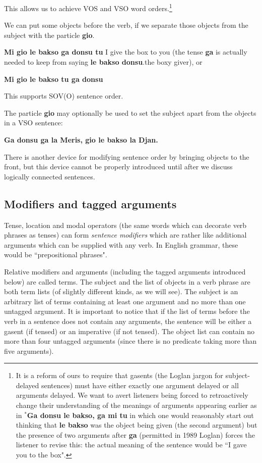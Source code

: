 \documentclass[12pt]{book}
\begin{document}
{This allows us to achieve VOS and VSO word orders.\footnote{It is a reform of ours to require that gasents (the Loglan jargon for subject-delayed sentences) must
have either exactly one argument delayed or all arguments delayed.  We want to avert listeners being forced to retroactively change their understanding of the meanings of arguments appearing earlier as in {\bf $^*$Ga donsu le bakso, ga mi tu}  in which one would reasonably start out thinking that {\bf le bakso} was the object being given (the second argument) but  the presence of two arguments after {\bf ga} (permitted in 1989 Loglan) forces the listener to revise this:  the actual meaning of the sentence would be ``I gave you to the box".}

We can put some objects before the verb, if we separate those objects from the subject with the particle {\bf gio}.

{\bf Mi gio le bakso ga donsu tu}  I give the box to you (the tense {\bf ga} is actually needed to keep from saying {\bf le bakso donsu}.the boxy giver), or

{\bf Mi gio le bakso tu ga donsu} 

This supports SOV(O) sentence order.

The particle {\bf gio} may optionally be used to set the subject apart from the objects in a VSO sentence:

{\bf Ga donsu ga  la Meris, gio  le bakso la Djan.}

There is another device for modifying sentence order by bringing objects to the front, but this device cannot be properly introduced until after we discuss logically connected sentences.

\subsection{Modifiers and tagged arguments}

Tense, location and modal operators (the same words which can decorate verb phrases as tenses) can form {\em sentence modifiers\/} which are rather like additional arguments
which can be supplied with any verb.  In English grammar, these would be ``prepositional phrases".

Relative modifiers and arguments (including the tagged arguments introduced below) are called terms.  The subject and the list of objects in a verb phrase are both
term lists (of slightly different kinds, as we will see).  The subject is an arbitrary list of terms containing at least one argument and no more than one untagged argument.  It is important to notice that if the list of terms before the verb in a sentence does not contain any arguments, the sentence will be either a gasent (if tensed) or an imperative (if not tensed).
The object list can contain no more than four untagged arguments (since there is no predicate taking more than five arguments).

}
\end{document}
